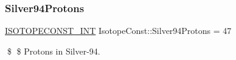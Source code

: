 \subsubsection{\texorpdfstring{Silver94\+Protons}{Silver94Protons}}
{\footnotesize\ttfamily \mbox{\hyperlink{group___isotope_const-_macros_ga5f18360b3e99483a35c32d789e62621c}{I\+S\+O\+T\+O\+P\+E\+C\+O\+N\+S\+T\+\_\+\+I\+NT}} Isotope\+Const\+::\+Silver94\+Protons = 47}

\$ \$ Protons in Silver-\/94. 